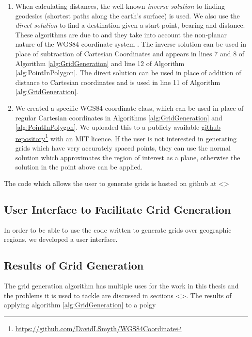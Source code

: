 \begin{enumerate}
    \item When calculating distances, the well-known \textit{inverse solution} to finding geodesics (shortest paths along the earth's surface) is used. We also use the \textit{direct solution} to find a destination given a start point, bearing and distance. These algorithms are due to \citeauthor{Vincenty1975DirectEquations} and they take into account the non-planar nature of the WGS84 coordinate system \cite{Vincenty1975DirectEquations}. The inverse solution can be used in place of subtraction of Cartesian Coordinates and appears in lines 7 and 8 of Algorithm \ref{alg:GridGeneration} and line 12 of Algorithm \ref{alg:PointInPolygon}. The direct solution can be used in place of addition of distance to Cartesian coordinates and is used in line 11 of Algorithm \ref{alg:GridGeneration}.
    
    \item We created a specific WGS84 coordinate class, which can be used in place of regular Cartesian coordinates in Algorithms \ref{alg:GridGeneration} and \ref{alg:PointInPolygon}. We uploaded this to a publicly available  \href{https://github.com/DavidLSmyth/WGS84Coordinate}{github repository}\footnote{\href {https://github.com/DavidLSmyth/WGS84Coordinate}{https://github.com/DavidLSmyth/WGS84Coordinate}} with an MIT licence. If the user is not interested in generating grids which have very accurately spaced points, they can use the normal solution which approximates the region of interest as a plane, otherwise the solution in the point above can be applied.
\end{enumerate}

The code which allows the user to generate grids is hosted on github at <> 

\subsection{User Interface to Facilitate Grid Generation}
In order to be able to use the code written to generate grids over geographic regions, we developed a user interface. 

\subsection{Results of Grid Generation}
The grid generation algorithm has multiple uses for the work in this thesis and the problems it is used to tackle are discussed in sections <>. The results of applying algorithm \ref{alg:GridGeneration} to a polgy
















